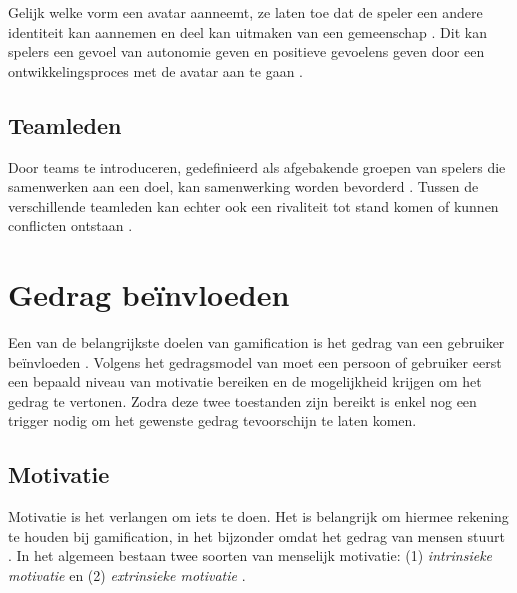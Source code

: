Gelijk welke vorm een avatar aanneemt, ze laten toe dat de speler een andere identiteit kan aannemen en deel kan uitmaken van een gemeenschap \autocite{Annetta2010}. Dit kan spelers een gevoel van autonomie geven en positieve gevoelens geven door een ontwikkelingsproces met de avatar aan te gaan \autocite{Sailer2013}.

\subsection{Teamleden}

Door teams te introduceren, gedefinieerd als afgebakende groepen van spelers die samenwerken aan een doel, kan samenwerking worden bevorderd \autocite{Sailer2016}. Tussen de verschillende teamleden kan echter ook een rivaliteit tot stand komen of kunnen conflicten ontstaan \autocite{Kapp2012}.

\section{Gedrag beïnvloeden}

Een van de belangrijkste doelen van gamification is het gedrag van een gebruiker beïnvloeden \autocite{AlMarshedi2015}. Volgens het gedragsmodel van \textcite{Fogg2009} moet een persoon of gebruiker eerst een bepaald niveau van motivatie bereiken en de mogelijkheid krijgen om het gedrag te vertonen. Zodra deze twee toestanden zijn bereikt is enkel nog een trigger nodig om het gewenste gedrag tevoorschijn te laten komen.

\subsection{Motivatie}

Motivatie is het verlangen om iets te doen. Het is belangrijk om hiermee rekening te houden bij gamification, in het bijzonder omdat het gedrag van mensen stuurt \autocite{AlMarshedi2015}. In het algemeen bestaan twee soorten van menselijk motivatie: (1) \textit{intrinsieke motivatie} en (2) \textit{extrinsieke motivatie} \autocite{Yang2017}.

